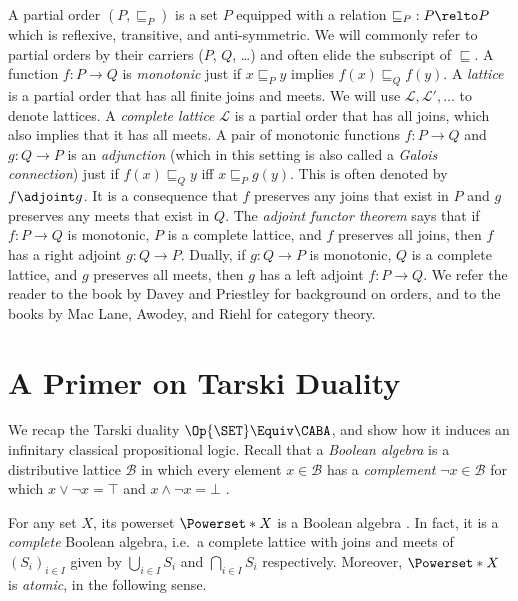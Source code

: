 A partial order $(P, \sqsubseteq_P)$ is a set $P$ equipped with a relation
$\mathord{\sqsubseteq_P} : P \relto P$ which is reflexive, transitive, and
anti-symmetric. We will commonly refer to partial orders by their carriers ($P$,
$Q$, \ldots) and often elide the subscript of $\sqsubseteq$. A function $f : P
\to Q$ is \emph{monotonic} just if $x \sqsubseteq_P y$ implies $f(x)
\sqsubseteq_Q f(y)$. A \emph{lattice} is a partial order that has all finite
joins and meets. We will use $\mathcal{L}, \mathcal{L}', \ldots$ to denote
lattices. A \emph{complete lattice} $\mathcal{L}$ is a partial order that has
all joins, which also implies that it has all meets. A pair of monotonic
functions $f : P \to Q$ and $g : Q \to P$ is an \emph{adjunction} (which in this
setting is also called a \emph{Galois connection}) just if $f(x) \sqsubseteq_Q
y$ iff $x \sqsubseteq_P g(y)$. This is often denoted by $f \adjoint g$. It is a
consequence that $f$ preserves any joins that exist in $P$ and $g$ preserves any
meets that exist in $Q$. The \emph{adjoint functor theorem} \cite[\S
7.34]{davey_2002} \cite[\S I.4.2]{johnstone_1982} says that if $f : P \to Q$ is
monotonic, $P$ is a complete lattice, and $f$ preserves all joins, then $f$ has
a right adjoint $g : Q \to P$. Dually, if \(g : Q \to P\) is monotonic, \(Q\) is
a complete lattice, and \(g\) preserves all meets, then \(g\) has a left adjoint
\(f : P \to Q\). We refer the reader to the book by Davey and Priestley
\cite{davey_2002} for background on orders, and to the books by Mac Lane,
Awodey, and Riehl \cite{mac_lane_1978,awodey_2010,riehl_2016} for category
theory.


\section{A Primer on Tarski Duality}\label{section:tarski}

We recap the Tarski duality $\Op{\SET} \Equiv \CABA$, and show how it induces an
infinitary classical propositional logic. Recall that a \emph{Boolean algebra}
is a distributive lattice $\mathcal{B}$ in which every element $x \in
\mathcal{B}$ has a \emph{complement} $\lnot x \in \mathcal{B}$ for which $x \lor
\lnot x = \top$ and $x \land \lnot x = \bot$ \cite{johnstone_1982}.

For any set $X$, its powerset $\Powerset*{X}$ is a Boolean algebra \cite[\S
5.2]{davey_2002}. In fact, it is a \emph{complete} Boolean algebra, i.e.\ a complete
lattice with joins and meets of $(S_i)_{i \in I}$ given by $\bigcup_{i \in I} S_i$ and
$\bigcap_{i \in I} S_i$ respectively. Moreover, $\Powerset*{X}$ is \emph{atomic}, in the
following sense.

